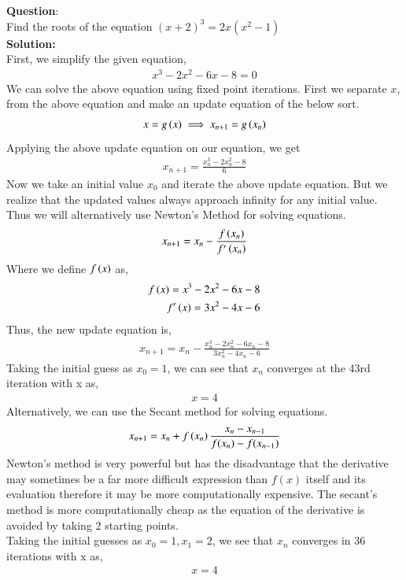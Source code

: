 \documentclass[journal]{IEEEtran}
\begin{document}
	
\textbf{Question}:\\
Find the roots of the equation \( (x + 2)^3 = 2x (x^2 - 1) \)
\\
\textbf{Solution: }\\
First, we simplify the given equation,
\begin{align}
	x^3 -2x^2 - 6x - 8 = 0
\end{align}
We can solve the above equation using fixed point iterations. First we separate $x$, from the above equation and make an update equation of the below sort.
\begin{align}
	x = g\left(x\right) \implies x_{n+1} = g\left(x_n\right)
\end{align}
Applying the above update equation on our equation, we get
\begin{align}
	x_{n+1} = 	\frac{x_n^3 -2x_n^2 - 8}{6}
\end{align}
Now we take an initial value $x_0$ and iterate the above update equation. But we realize that the updated values always approach infinity for any initial value. \\
Thus we will alternatively use Newton's Method for solving equations.
\begin{align}
	x_{n+1} = x_n - \frac{f\left(x_n\right)}{f^{\prime}\left(x_n\right)} 
\end{align}
Where we define $f\left(x\right)$ as, 
\begin{align}
	f\left(x\right) = x^3 -2x^2 - 6x - 8 \\
	f^{\prime}\left(x\right) = 3x^2 -4x - 6 
\end{align}
Thus, the new update equation is, 
\begin{align}
	x_{n+1} = x_n - \frac{x_n^3 -2x_n^2 - 6x_n - 8}{3x_n^2 -4x_n - 6 } 
\end{align}
Taking the initial guess as $x_0 = 1$, we can see that $x_n$ converges at the 43rd iteration with x as,
\begin{align}
	x = 4
\end{align}
Alternatively, we can use the Secant method for solving equations.
\begin{align}
	x_{n+1} = x_n + f\left(x_n\right)\frac{x_{n} -  x_{n-1}}{f(x_{n}) -  f(x_{n-1})}
\end{align}
Newton's method is very powerful but has the disadvantage that the derivative may sometimes be a far more difficult expression than \(f(x)\) itself and its evaluation therefore it may be more computationally expensive. The secant's method is more computationally cheap as the equation of the derivative is avoided by taking 2 starting points.\\ 
Taking the initial guesses as $x_0 = 1, x_1 = 2$, we see that $x_n$ converges in 36 iterations with x as,
\begin{align}
	x = 4
\end{align} 
 
\end{document}
